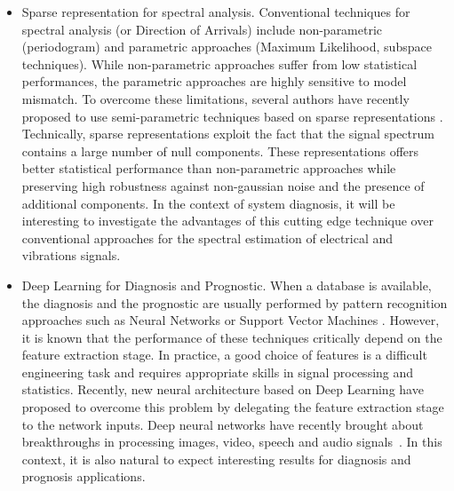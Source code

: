 \documentclass{article}
\begin{document}
\begin{itemize}
\item Sparse representation for spectral analysis. Conventional techniques for spectral analysis (or Direction of Arrivals) include non-parametric (periodogram) and parametric approaches (Maximum Likelihood, subspace techniques). While non-parametric approaches suffer from low statistical performances, the parametric approaches are highly sensitive to model mismatch. To overcome these limitations, several authors have recently proposed to use semi-parametric techniques based on sparse representations  \cite{BHA13,TAN13,YAN16}. Technically, sparse representations exploit the fact that the signal spectrum contains a large number of null components. These representations offers better statistical performance than non-parametric approaches while preserving high robustness against non-gaussian noise and the presence of additional components. In the context of system diagnosis, it will be interesting to investigate the advantages of this cutting edge technique over conventional approaches for the spectral estimation of electrical and vibrations signals. 

\item Deep Learning for Diagnosis and Prognostic. When a database is available, the diagnosis and the prognostic are usually performed by pattern recognition approaches such as Neural Networks or Support Vector Machines \cite{BIS06}. However, it is known that the performance of these techniques critically depend on the feature extraction stage. In practice, a good choice of features is a difficult engineering task and requires appropriate skills in signal processing and statistics. Recently, new neural architecture based on Deep Learning have proposed to overcome this problem by delegating the feature extraction stage to the network inputs. Deep neural networks have recently brought about breakthroughs in processing images, video, speech and audio signals~\cite{LECUN15}. In this context, it is also natural to expect interesting results for diagnosis and prognosis applications.

\end{itemize}



   
 
\end{document}
